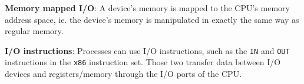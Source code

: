 

\textbf{Memory mapped I/O}: A device's memory is mapped to the CPU's memory address space, ie. the device's memory is manipulated in exactly the same way as regular memory.

\textbf{I/O instructions}: Processes can use I/O instructions, such as the \texttt{IN} and \texttt{OUT} instructions in the \texttt{x86} instruction set. Those two transfer data between I/O devices and registers/memory through the I/O ports of the CPU.
